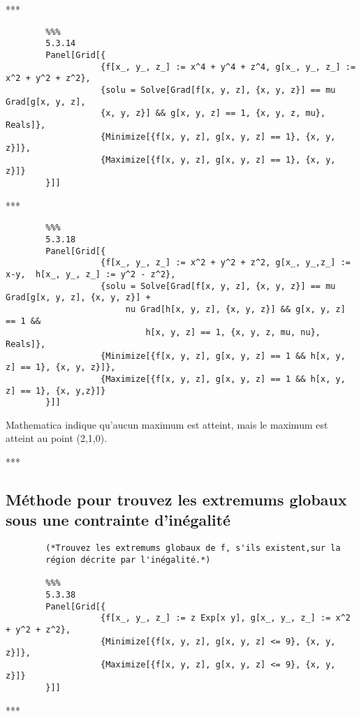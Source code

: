 	\begin{center}***\end{center}
	
	\begin{verbatim}
		%%%
		5.3.14
		Panel[Grid[{
		           {f[x_, y_, z_] := x^4 + y^4 + z^4, g[x_, y_, z_] := x^2 + y^2 + z^2},
		           {solu = Solve[Grad[f[x, y, z], {x, y, z}] == mu Grad[g[x, y, z], 
		           {x, y, z}] && g[x, y, z] == 1, {x, y, z, mu}, Reals]},
		           {Minimize[{f[x, y, z], g[x, y, z] == 1}, {x, y, z}]},
		           {Maximize[{f[x, y, z], g[x, y, z] == 1}, {x, y, z}]}
		}]]
	\end{verbatim}
	
	\begin{center}***\end{center}
	
	\begin{verbatim}
		%%%
		5.3.18
		Panel[Grid[{
		           {f[x_, y_, z_] := x^2 + y^2 + z^2, g[x_, y_,z_] := x-y,	h[x_, y_, z_] := y^2 - z^2},
		           {solu = Solve[Grad[f[x, y, z], {x, y, z}] == mu Grad[g[x, y, z], {x, y, z}] + 
		                nu Grad[h[x, y, z], {x, y, z}] && g[x, y, z] == 1 && 
		                    h[x, y, z] == 1, {x, y, z, mu, nu}, Reals]},
		           {Minimize[{f[x, y, z], g[x, y, z] == 1 && h[x, y, z] == 1}, {x, y, z}]},
		           {Maximize[{f[x, y, z], g[x, y, z] == 1 && h[x, y, z] == 1}, {x, y,z}]}
		}]]
	\end{verbatim}
	Mathematica indique qu'aucun maximum est atteint, mais le maximum est atteint au point (2,1,0).
	
	\begin{center}***\end{center}
	
\subsection{Méthode pour trouvez les extremums globaux sous une contrainte d'inégalité}
	\begin{verbatim}
		(*Trouvez les extremums globaux de f, s'ils existent,sur la
		région décrite par l'inégalité.*)
		
		%%%
		5.3.38
		Panel[Grid[{
		           {f[x_, y_, z_] := z Exp[x y], g[x_, y_, z_] := x^2 + y^2 + z^2},
		           {Minimize[{f[x, y, z], g[x, y, z] <= 9}, {x, y, z}]},
		           {Maximize[{f[x, y, z], g[x, y, z] <= 9}, {x, y, z}]}
		}]]
	\end{verbatim}
	
	\begin{center}***\end{center}
